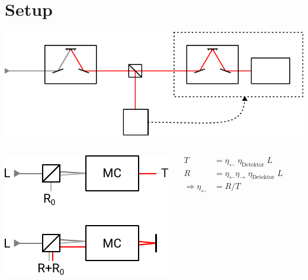 \section{Setup}
\begin{frame}
	\centering
	\includegraphics{./figures/setup.pdf}
\end{frame}





\begin{frame}
	\begin{columns}
		\centering
		\includegraphics{figures/setup single monochromator.pdf}

		\begin{align*}
			T &= \eta_\leftarrow \;\eta_\text{Detektor}\; L \\
			R &= \eta_\leftarrow \eta_\rightarrow\; \eta_\text{Detektor}\;L\\
			\Rightarrow \eta_\leftarrow &= R /T
		\end{align*}
	\end{columns}
\end{frame}